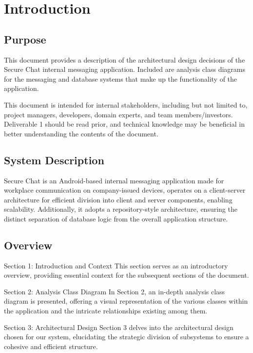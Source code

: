 \documentclass[]{article}
\begin{document}
\newpage
\section{Introduction}
\label{sec:introduction}


\subsection{Purpose}
\label{sub:purpose}
This document provides a description of the architectural design decisions of the Secure Chat internal messaging application. Included are analysis class diagrams for the messaging and database systems that make up the functionality of the application. 

This document is intended for internal stakeholders, including but not limited to, project managers, developers, domain experts, and team members/investors. Deliverable 1 should be read prior, and technical knowledge may be beneficial in better understanding the contents of the document. 

\subsection{System Description}
\label{sub:system_description}
Secure Chat is an Android-based internal messaging application made for workplace communication on company-issued devices, operates on a client-server architecture for efficient division into client and server components, enabling scalability. Additionally, it adopts a repository-style architecture, ensuring the distinct separation of database logic from the overall application structure.

\subsection{Overview}
\label{sub:overview}
\indent \par
Section 1: Introduction and Context
This section serves as an introductory overview, providing essential context for the subsequent sections of the document.

Section 2: Analysis Class Diagram
In Section 2, an in-depth analysis class diagram is presented, offering a visual representation of the various classes within the application and the intricate relationships existing among them.

Section 3: Architectural Design
Section 3 delves into the architectural design chosen for our system, elucidating the strategic division of subsystems to ensure a cohesive and efficient structure.
\end{document}
